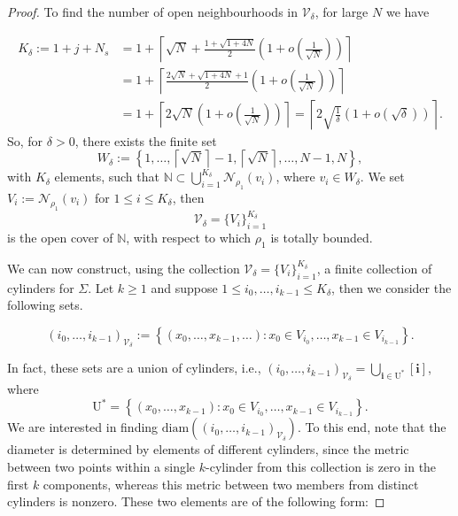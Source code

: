 \documentclass[11pt, reqno]{amsart}
\theoremstyle{plain}%
\theoremstyle{definition}
\theoremstyle{definition}
\def\N{\ensuremath{\mathbb N}}
\def\i{\textbf{i}}
\numberwithin{equation}{section}
\begin{document}
\begin{proof}
To find the number of open neighbourhoods in $\mathcal{V}_\delta$, for large $N$ we have 

\begin{align*}
K_\delta:=1+ j+N_s&=1+\left\lceil \sqrt{N}+\frac{1+ \sqrt{1+4N}}{2}\left(1+o\left(\frac{1}{\sqrt{N}}\right)\right)\right\rceil\\&=1+\left\lceil \frac{2\sqrt{N}+\sqrt{1+4N}+1}{2}\left(1+o\left(\frac{1}{\sqrt{N}}\right)\right)\right\rceil \\&=1+\left\lceil 2\sqrt{N}\left(1+o\left(\frac{1}{\sqrt{N}}\right)\right)\right\rceil
=\left\lceil2\sqrt{\frac{1}{\delta}}\left(1+o\left(\sqrt{\delta}\right)\right)\right\rceil.
\end{align*}
So, for $\delta>0$, there exists the finite set $$W_\delta:=\left\{1,\ldots, \left\lceil\sqrt{N}\right\rceil-1,\left\lceil\sqrt{N}\right\rceil,\ldots,N-1,N\right\},$$ with $K_\delta$ elements, such that $\N\subset\bigcup_{i=1}^{K_\delta}\mathcal{N}_{\rho_1}(v_i)$, where $v_i\in W_\delta$. We set $V_i:=\mathcal{N}_{\rho_1}(v_i)$ for $1\le i\le K_\delta $, then \begin{equation}\label{Def:V_delta}
    \mathcal{V}_\delta=\{V_i\}_{i=1}^{K_\delta}
\end{equation} is the open cover of $\N$, with respect to which ${\rho_1}$ is totally bounded.

We can now construct, using the collection $\mathcal{V}_\delta=\{V_i\}_{i=1}^{K_\delta}$, a finite collection of cylinders for $\Sigma$. Let $k\ge 1$ and suppose $1\le i_0,\ldots,i_{k-1}\le K_\delta$, then we consider the following sets.



\begin{equation}\label{Def: Z_i_0}
(i_0,\ldots,i_{k-1})_{\mathcal{V}_\delta}:=\left\{ (x_0,\ldots,x_{k-1},\ldots): x_0\in V_{i_0},\ldots,x_{k-1}\in V_{i_{k-1}}  \right\}.\end{equation}

In fact, these sets are a union of cylinders, i.e., $(i_0,\ldots,i_{k-1})_{\mathcal{V}_\delta}=\bigcup_{\i\in \mathrm{U^*}}[\i]$, where $$\mathrm{U^*}=\left\{ (x_0,\ldots,x_{k-1}):  x_0\in V_{i_0},\ldots,x_{k-1}\in V_{i_{k-1}}    \right\}.$$ We are interested in finding $\text{diam}\left((i_0,\ldots,i_{k-1})_{\mathcal{V}_\delta}\right)$. To this end, note that the diameter is determined by elements of different cylinders, since the metric between two points within a single $k$-cylinder from this collection is zero in the first $k$ components, whereas this metric between two members from distinct cylinders is nonzero. These two elements are of the following form:



\end{proof}
\end{document}
